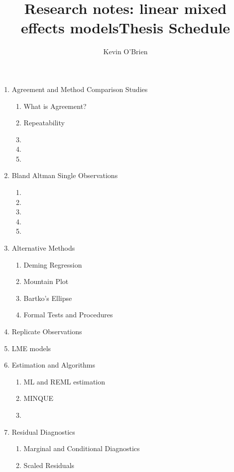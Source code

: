 \documentclass[12pt, a4paper]{article}
\title{Research notes: linear mixed effects models}
\author{ } \date{ }
\theoremstyle{plain}
\theoremstyle{definition}
\theoremstyle{remark}
\begin{document}
\author{Kevin O'Brien}
\title{Thesis Schedule}


\begin{enumerate}
\item Agreement and Method Comparison Studies
\begin{enumerate}
\item What is Agreement?
\item Repeatability
\item
\item
\item
\end{enumerate}
\item Bland Altman Single Observations
\begin{enumerate}
\item
\item
\item
\item
\item
\end{enumerate}
\item Alternative Methods
    \begin{enumerate}
    \item Deming Regression
    \item Mountain Plot
    \item Bartko's Ellipse
    \item Formal Tests and Procedures
    \end{enumerate}
\item Replicate Observations

\item LME models

\item Estimation and Algorithms
    \begin{enumerate}
    \item ML and REML estimation
    \item MINQUE
    \item
    \end{enumerate}
\item Residual Diagnostics
    \begin{enumerate}
    \item Marginal and Conditional Diagnostics
    \item Scaled Residuals
    \end{enumerate}


\end{enumerate}
\end{document}
